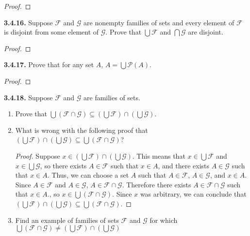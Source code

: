 \documentclass[12pt]{amsart}
\newenvironment{statement}[1]{\smallskip\noindent\color[rgb]{.6627, .3529, .6314} {\bf #1.}}{}
\theoremstyle{definition}
\theoremstyle{remark}
\newcommand{\powerset}[1]{\mathscr{P} \left( #1 \right)}
\begin{document}
\begin{proof}
\end{proof}


\begin{statement}{3.4.16}
Suppose $\mathcal{F}$ and $\mathcal{G}$ are nonempty families of sets and every element of $\mathcal{F}$ is disjoint from some element of $\mathcal{G}$.
Prove that $\bigcup \mathcal{F}$ and $\bigcap \mathcal{G}$ are disjoint.
\end{statement}

\begin{proof}
\end{proof}


\begin{statement}{3.4.17}
Prove that for any set $A$, $A = \bigcup \powerset{A}$.
\end{statement}

\begin{proof}
\end{proof}


\begin{statement}{3.4.18}
Suppose $\mathcal{F}$ and $\mathcal{G}$ are families of sets.
\begin{enumerate}
	\item Prove that $\bigcup (\mathcal{F} \cap \mathcal{G}) \subseteq
	\left( \bigcup \mathcal{F} \right) \cap \left( \bigcup \mathcal{G} \right)$.
	
	\item What is wrong with the following proof that 
	$\left( \bigcup \mathcal{F} \right) \cap \left( \bigcup \mathcal{G} \right) \subseteq
	 \bigcup (\mathcal{F} \cap \mathcal{G})$?
	 \begin{proof}
	 	Suppose $x \in \left( \bigcup \mathcal{F} \right) \cap \left( \bigcup \mathcal{G} \right)$.
	 	This means that $x \in \bigcup \mathcal{F}$ and $x \in \bigcup \mathcal{G}$,
	 	so there exists $A \in \mathcal{F}$ such that $x \in A$, 
	 	and there exists $A \in \mathcal{G}$ such that $x \in A$.
	 	Thus, we can choose a set $A$ such that 
	 	$A \in \mathcal{F}$, $A \in \mathcal{G}$, and $x \in A$.
	 	Since $A \in \mathcal{F}$ and $A \in \mathcal{G}$, $A \in \mathcal{F} \cap \mathcal{G}$.
	 	Therefore there exists $A \in \mathcal{F} \cap \mathcal{G}$ such that $x \in A$.,
	 	so $x \in \bigcup (\mathcal{F} \cap \mathcal{G})$.
	 	Since $x$ was arbitrary, we can conclude that
	 	$\left( \bigcup \mathcal{F} \right) \cap \left( \bigcup \mathcal{G} \right) \subseteq
	 	\bigcup (\mathcal{F} \cap \mathcal{G})$.
	 \end{proof}
	 
	 \item Find an example of families of sets $\mathcal{F}$ and $\mathcal{G}$ for which
	 $\bigcup (\mathcal{F} \cap \mathcal{G}) \neq
	\left( \bigcup \mathcal{F} \right) \cap \left( \bigcup \mathcal{G} \right)$
\end{enumerate}
\end{statement}
\end{document}
